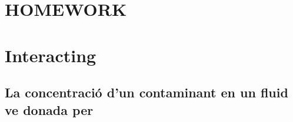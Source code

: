 \documentclass[a4paper,12pt]{article}
\begin{document}
 	


\section*{\small{\textbf{HOMEWORK}}}
\section{\small{\textbf{Interacting }}}


\subsection{\small{}} %


\subsection{\small{La concentració d'un contaminant en un fluid ve donada per}}
\end{document}
